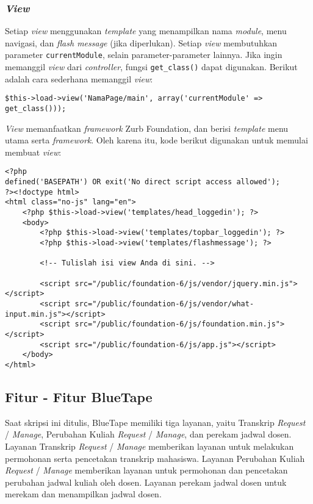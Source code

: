 \subsubsection{\textit{View}}
	Setiap \textit{view} menggunakan \textit{template} yang menampilkan nama \textit{module}, menu navigasi, dan \textit{flash message} (jika diperlukan). Setiap \textit{view} membutuhkan parameter \texttt{currentModule}, selain parameter-parameter lainnya. Jika ingin memanggil \textit{view} dari \textit{controller}, fungsi \texttt{get\_class()} dapat digunakan. Berikut adalah cara sederhana memanggil \textit{view}:  
\begin{lstlisting}
$this->load->view('NamaPage/main', array('currentModule' => get_class()));
\end{lstlisting}

	\textit{View} memanfaatkan \textit{framework} Zurb Foundation, dan berisi \textit{template} menu utama serta \textit{framework}. Oleh karena itu, kode berikut digunakan untuk memulai membuat \textit{view}:
\begin{lstlisting}
<?php
defined('BASEPATH') OR exit('No direct script access allowed');
?><!doctype html>
<html class="no-js" lang="en">
    <?php $this->load->view('templates/head_loggedin'); ?>
    <body>
        <?php $this->load->view('templates/topbar_loggedin'); ?>
        <?php $this->load->view('templates/flashmessage'); ?>

        <!-- Tulislah isi view Anda di sini. -->

        <script src="/public/foundation-6/js/vendor/jquery.min.js"></script>
        <script src="/public/foundation-6/js/vendor/what-input.min.js"></script>
        <script src="/public/foundation-6/js/foundation.min.js"></script>
        <script src="/public/foundation-6/js/app.js"></script>
    </body>
</html>
\end{lstlisting}

\subsection{Fitur - Fitur BlueTape}
	Saat skripsi ini ditulis, BlueTape memiliki tiga layanan, yaitu Transkrip \textit{Request} / \textit{Manage}, Perubahan Kuliah \textit{Request} / \textit{Manage}, dan perekam jadwal dosen. Layanan Transkrip \textit{Request} / \textit{Manage} memberikan layanan untuk melakukan permohonan serta pencetakan transkrip mahasiswa. Layanan Perubahan Kuliah \textit{Request} / \textit{Manage} memberikan layanan untuk permohonan dan pencetakan perubahan jadwal kuliah oleh dosen. Layanan perekam jadwal dosen untuk merekam dan menampilkan jadwal dosen.

